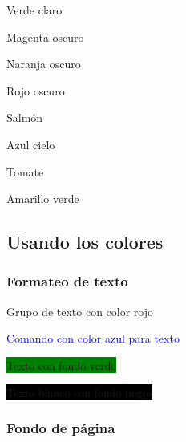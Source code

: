 \documentclass{article}
\begin{document}
{\color{LightGreen} Verde claro}

{\color{DarkMagenta} Magenta oscuro}

{\color{DarkOrange} Naranja oscuro}

{\color{DarkRed} Rojo oscuro}

{\color{Salmon} Salmón}

{\color{SkyBlue} Azul cielo}

{\color{Tomato} Tomate}

{\color{YellowGreen} Amarillo verde}

\subsection{Usando los colores}
\subsubsection{Formateo de texto}

{\color{red} Grupo de texto con color rojo}

\textcolor{blue}{Comando con color azul para texto}

\colorbox{green}{Texto con fondo verde}

\colorbox{black}{\color{white} Texto blanco con fondo negro}




\subsubsection{Fondo de página}

\pagecolor{lightgray}
\end{document}
